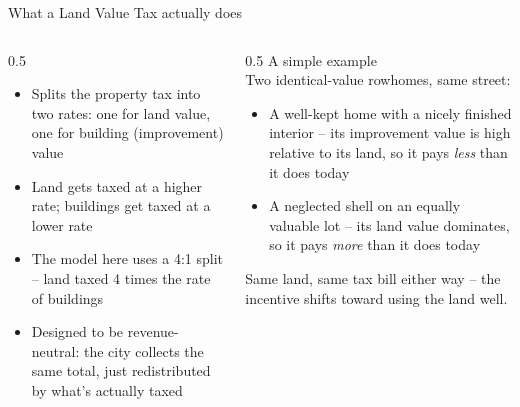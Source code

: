 \documentclass[aspectratio=169,11pt]{beamer}
\begin{document}
\begin{frame}{What a Land Value Tax actually does}
\begin{columns}[T]
\begin{column}{0.5\linewidth}
\vspace{0.6em}
\begin{itemize}
\item Splits the property tax into two rates: one for land value, one for building (improvement) value
\item Land gets taxed at a higher rate; buildings get taxed at a lower rate
\item The model here uses a 4:1 split -- land taxed 4 times the rate of buildings
\item Designed to be revenue-neutral: the city collects the same total, just redistributed by what's actually taxed
\end{itemize}
\end{column}
\begin{column}{0.5\linewidth}
\vspace{1.0em}
{\small\color{deckmuted} A simple example}\\[0.4em]
Two identical-value rowhomes, same street:
\begin{itemize}
\item A well-kept home with a nicely finished interior -- its improvement value is high relative to its land, so it pays \emph{less} than it does today
\item A neglected shell on an equally valuable lot -- its land value dominates, so it pays \emph{more} than it does today
\end{itemize}
{\footnotesize\color{deckmuted} Same land, same tax bill either way -- the incentive shifts toward using the land well.}
\end{column}
\end{columns}
\end{frame}
\end{document}
